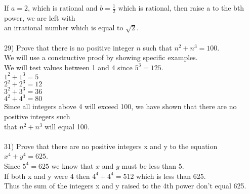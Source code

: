 \documentclass{article}
\begin{document}
\begin{flushleft}
\setlength\parindent{24pt} If $a = 2$, which is rational and $b = \frac{1}{2} $ which is rational, then raise a to the bth power, we are left with\\ an irrational number which is equal to $\sqrt{2}$.\\
~\\
\setlength\parindent{0pt}29) Prove that there is no positive integer $n$ such that $n^2 + n^3 = 100$. \\
\setlength\parindent{24pt} We will use a constructive proof by showing specific examples.\\
\setlength\parindent{24pt} We will test values between 1 and 4 since $5^3 = 125$.\\
\setlength\parindent{24pt} $1^2 + 1^3 = 5$\\
\setlength\parindent{24pt} $2^2 + 2^3 = 12$ \\
\setlength\parindent{24pt} $3^2 + 3^3 = 36$\\
\setlength\parindent{24pt} $4^2 + 4^3 = 80$ \\
\setlength\parindent{24pt} Since all integers above 4 will exceed 100, we have shown that there are no positive integers such \\that $n^2 + n^3 $ will equal 100.\\
~\\
\setlength\parindent{0pt}31) Prove that there are no positive integers x and y to the equation $x^4 + y^4 = 625$. \\

\setlength\parindent{24pt} Since $5^4 = 625$ we know that $x$ and $y$ must be less than 5.\\
\setlength\parindent{24pt} If both x and y were 4 then $4^4 + 4^4 = 512$ which is less than 625.\\
\setlength\parindent{24pt} Thus the sum of the integers x and y raised to the 4th power don't equal 625.\\


\end{flushleft}
\end{document}
